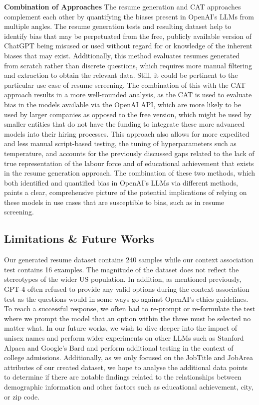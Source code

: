 \documentclass{article}
\begin{document}
\textbf{Combination of Approaches} The resume generation and CAT approaches complement each other by quantifying the biases present in OpenAI's LLMs from multiple angles. The resume generation tests and resulting dataset help to identify bias that may be perpetuated from the free, publicly available version of ChatGPT being misused or used without regard for or knowledge of the inherent biases that may exist. Additionally, this method evaluates resumes generated from scratch rather than discrete questions, which requires more manual filtering and extraction to obtain the relevant data. Still, it could be pertinent to the particular use case of resume screening. The combination of this with the CAT approach results in a more well-rounded analysis, as the CAT is used to evaluate bias in the models available via the OpenAI API, which are more likely to be used by larger companies as opposed to the free version, which might be used by smaller entities that do not have the funding to integrate these more advanced models into their hiring processes. This approach also allows for more expedited and less manual script-based testing, the tuning of hyperparameters such as temperature, and accounts for the previously discussed gaps related to the lack of true representation of the labour force and of educational achievement that exists in the resume generation approach. The combination of these two methods, which both identified and quantified bias in OpenAI's LLMs via different methods, paints a clear, comprehensive picture of the potential implications of relying on these models in use cases that are susceptible to bias, such as in resume screening.


\subsection{Limitations \& Future Works}
Our generated resume dataset contains 240 samples while our context association test contains 16 examples. The magnitude of the dataset does not reflect the stereotypes of the wider US population. In addition, as mentioned previously, GPT-4 often refused to provide any valid options during the context association test as the questions would in some ways go against OpenAI's ethics guidelines. To reach a successful response, we often had to re-prompt or re-formulate the test where we prompt the model that an option within the three must be selected no matter what. 
In our future works, we wish to dive deeper into the impact of unisex names and perform wider experiments on other LLMs such as Stanford Alpaca \cite{zhang2023llama} and Google's Bard \cite{rahaman2023ai} and perform additional testing in the context of college admissions. Additionally, as we only focused on the JobTitle and JobArea attributes of our created dataset, we hope to analyse the additional data points to determine if there are notable findings related to the relationships between demographic information and other factors such as educational achievement, city, or zip code. 
\end{document}
